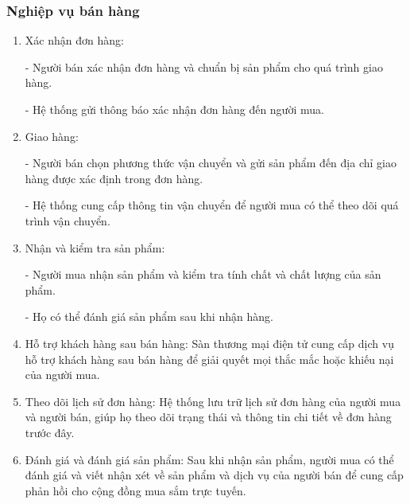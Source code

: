         \subsubsection{Nghiệp vụ bán hàng}
        \begin{enumerate}
            \item Xác nhận đơn hàng:
        
        - Người bán xác nhận đơn hàng và chuẩn bị sản phẩm cho quá trình giao hàng.
        
        - Hệ thống gửi thông báo xác nhận đơn hàng đến người mua.
            \item Giao hàng:
        
        - Người bán chọn phương thức vận chuyển và gửi sản phẩm đến địa chỉ giao hàng được xác định trong đơn hàng.
        
        - Hệ thống cung cấp thông tin vận chuyển để người mua có thể theo dõi quá trình vận chuyển.
        \item  Nhận và kiểm tra sản phẩm:
        
        - Người mua nhận sản phẩm và kiểm tra tính chất và chất lượng của sản phẩm.
        
        - Họ có thể đánh giá sản phẩm sau khi nhận hàng.
            \item Hỗ trợ khách hàng sau bán hàng:
        Sàn thương mại điện tử cung cấp dịch vụ hỗ trợ khách hàng sau bán hàng để giải quyết mọi thắc mắc hoặc khiếu nại của người mua.
            \item Theo dõi lịch sử đơn hàng:
        Hệ thống lưu trữ lịch sử đơn hàng của người mua và người bán, giúp họ theo dõi trạng thái và thông tin chi tiết về đơn hàng trước đây.
            \item Đánh giá và đánh giá sản phẩm:
        Sau khi nhận sản phẩm, người mua có thể đánh giá và viết nhận xét về sản phẩm và dịch vụ của người bán để cung cấp phản hồi cho cộng đồng mua sắm trực tuyến.
        \end{enumerate}
        
